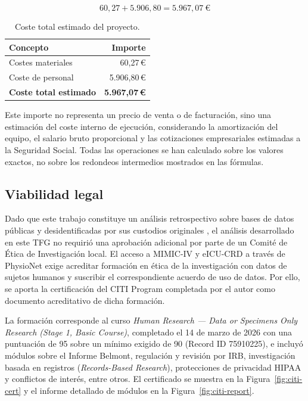 \documentclass[
  spanish,
  a4paper,
  12pt,
  twoside]{memoir}
\begin{document}
\[
60{,}27 + 5.906{,}80 = 5.967{,}07\ \text{€}
\]

\begin{table}[H]
\centering
\caption{Coste total estimado del proyecto.}
\label{tab:coste_total}
\begin{tabular}{lr}
\toprule
\textbf{Concepto} & \textbf{Importe} \\
\midrule
Costes materiales & 60,27\,€ \\
Coste de personal & 5.906,80\,€ \\
\midrule
\textbf{Coste total estimado} & \textbf{5.967,07\,€} \\
\bottomrule
\end{tabular}
\end{table}

Este importe no representa un precio de venta o de facturación, sino una estimación del coste interno de ejecución, considerando la amortización del equipo, el salario bruto proporcional y las cotizaciones empresariales estimadas a la Seguridad Social. Todas las operaciones se han calculado sobre los valores exactos, no sobre los redondeos intermedios mostrados en las fórmulas.

\subsection{Viabilidad legal}

Dado que este trabajo constituye un análisis retrospectivo sobre bases de datos públicas y desidentificadas por sus custodios originales \citep{johnson2023,pollard2018,physionet}, el análisis desarrollado en este TFG no requirió una aprobación adicional por parte de un Comité de Ética de Investigación local. El acceso a MIMIC-IV y eICU-CRD a través de PhysioNet exige acreditar formación en ética de la investigación con datos de sujetos humanos y suscribir el correspondiente acuerdo de uso de datos. Por ello, se aporta la certificación del CITI Program completada por el autor como documento acreditativo de dicha formación.

La formación corresponde al curso \emph{Human Research — Data or Specimens Only Research (Stage 1, Basic Course)}, completado el 14 de marzo de 2026 con una puntuación de 95 sobre un mínimo exigido de 90 (Record ID 75910225), e incluyó módulos sobre el Informe Belmont, regulación y revisión por IRB, investigación basada en registros (\emph{Records-Based Research}), protecciones de privacidad HIPAA y conflictos de interés, entre otros. El certificado se muestra en la Figura~\ref{fig:citi-cert} y el informe detallado de módulos en la Figura~\ref{fig:citi-report}.
\end{document}
